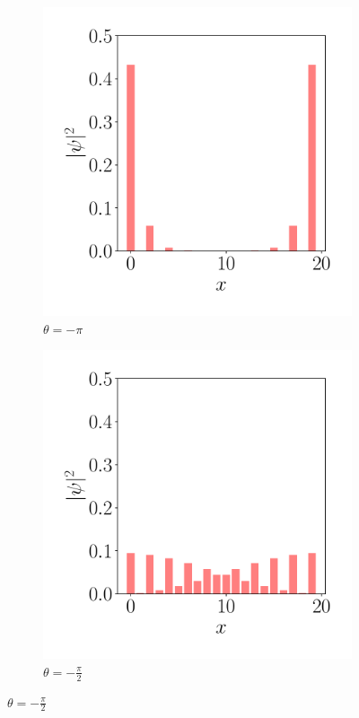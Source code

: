 \begin{figure}[h!]
    \centering
   \captionsetup[sub]{font=small}

    \begin{subfigure}[b!]{0.2 \textwidth}
        \caption*{$\theta=-\pi$}
        \includegraphics[width=\textwidth]{Imagenes/Shh_images/proyection_0.pdf}
    \end{subfigure}\hspace*{-0.9em}
    \begin{subfigure}[b!]{0.2 \textwidth}
        \caption*{$\theta=-\frac{\pi}{2}$}
        \includegraphics[width=\textwidth]{Imagenes/Shh_images/proyection_1.pdf}

\end{subfigure}
\end{figure}
